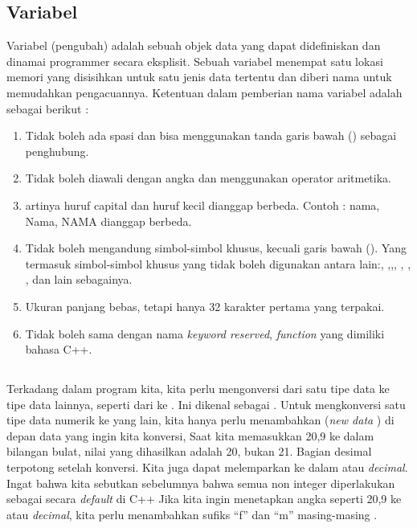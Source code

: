 \documentclass[../main.tex]{subfiles}
\begin{document}
    \subsection{Variabel}
    Variabel (pengubah) adalah sebuah objek data yang dapat didefiniskan dan dinamai programmer secara eksplisit. Sebuah variabel menempat satu lokasi memori yang disisihkan untuk satu jenis data tertentu dan diberi nama untuk memudahkan pengacuannya. Ketentuan dalam pemberian nama variabel adalah sebagai berikut \parencite{friyadi2005panduan}:
    \begin{enumerate}
        \item {
            Tidak boleh ada spasi dan bisa menggunakan tanda garis bawah ({\underscore})  sebagai penghubung.
        }
        \item {
            Tidak boleh diawali dengan angka dan menggunakan operator aritmetika.
        }
        \item {
            {\Casesensitive} artinya huruf capital dan huruf kecil dianggap berbeda. Contoh : nama, Nama, NAMA dianggap berbeda.
        }
        \item {
            Tidak boleh mengandung simbol-simbol khusus, kecuali garis bawah ({\underscore}). Yang termasuk simbol-simbol khusus yang tidak boleh digunakan antara lain:, ,,, , , ,  dan lain sebagainya.
        }
        \item {
            Ukuran panjang bebas, tetapi hanya 32 karakter pertama yang terpakai.
        }
        \item {
            Tidak boleh sama dengan nama \textit{keyword reserved}, \textit{function} yang dimiliki bahasa C++.
        }
    \end{enumerate}

    \subsection{{\Type} {\Casting}}
    Terkadang dalam program kita, kita perlu mengonversi dari satu tipe data ke tipe data lainnya, seperti dari  ke . Ini dikenal sebagai {\type} {\casting}. Untuk mengkonversi satu tipe data numerik ke yang lain, kita hanya perlu menambahkan (\textit{new data} {\type}) di depan data yang ingin kita konversi, Saat kita memasukkan 20,9 ke dalam bilangan bulat, nilai yang dihasilkan adalah 20, bukan 21. Bagian desimal terpotong setelah konversi. Kita juga dapat melemparkan  ke dalam  atau \textit{decimal}. Ingat bahwa kita sebutkan sebelumnya bahwa semua non integer diperlakukan sebagai  secara \textit{default} di C++ Jika kita ingin menetapkan angka seperti 20,9 ke  atau \textit{decimal}, kita perlu menambahkan sufiks ``f'' dan ``m'' masing-masing \parencite{raharjo2022bahasac}.
\end{document}
